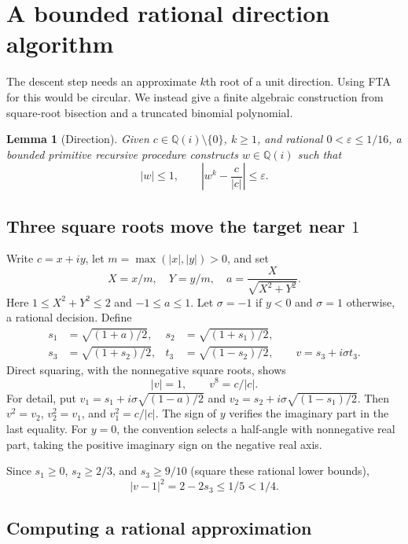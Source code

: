 \documentclass[11pt,letterpaper]{article}
\newtheorem{lemma}[theorem]{Lemma}
\theoremstyle{definition}\newtheorem{definition}[theorem]{Definition}
\theoremstyle{remark}\newtheorem{remark}[theorem]{Remark}
\newcommand{\GQ}{\mathbb Q(i)}\newcommand{\C}{\mathbb C}
\begin{document}
\section{A bounded rational direction algorithm}
\label{sec:direction}

The descent step needs an approximate $k$th root of a unit direction. Using
FTA for this would be circular. We instead give a finite algebraic
construction from square-root bisection and a truncated binomial polynomial.

\begin{lemma}[Direction]
\label{lem:direction}
Given $c\in\GQ\setminus\{0\}$, $k\ge1$, and rational
$0<\varepsilon\le1/16$, a bounded primitive recursive procedure constructs
$w\in\GQ$ such that
\[
 |w|\le1,\qquad
 \left|w^k-\frac{c}{|c|}\right|\le\varepsilon.
\]
\end{lemma}

\subsection{Three square roots move the target near \texorpdfstring{$1$}{1}}

Write $c=x+iy$, let $m=\max(|x|,|y|)>0$, and set
\[
 X=x/m,\quad Y=y/m,\quad
 a=\frac{X}{\sqrt{X^2+Y^2}}.
\]
Here $1\le X^2+Y^2\le2$ and $-1\le a\le1$.
Let $\sigma=-1$ if $y<0$ and $\sigma=1$ otherwise, a rational decision.
Define
\begin{align*}
 s_1&=\sqrt{(1+a)/2},&
 s_2&=\sqrt{(1+s_1)/2},\\
 s_3&=\sqrt{(1+s_2)/2},&
 t_3&=\sqrt{(1-s_2)/2},\qquad v=s_3+i\sigma t_3.
\end{align*}
Direct squaring, with the nonnegative square roots, shows
\[
 |v|=1,\qquad v^8=c/|c|.
\]
For detail, put
$v_1=s_1+i\sigma\sqrt{(1-a)/2}$ and
$v_2=s_2+i\sigma\sqrt{(1-s_1)/2}$.
Then $v^2=v_2$, $v_2^2=v_1$, and $v_1^2=c/|c|$.
The sign of $y$ verifies the imaginary part in the last equality. For
$y=0$, the convention selects a half-angle with nonnegative real part,
taking the positive imaginary sign on the negative real axis.

Since $s_1\ge0$, $s_2\ge2/3$, and $s_3\ge9/10$ (square these rational
lower bounds),
\begin{equation}
 |v-1|^2=2-2s_3\le1/5<1/4.
 \label{eq:v-near-one}
\end{equation}

\subsection{Computing a rational approximation}
\end{document}
